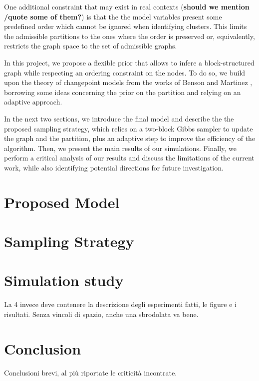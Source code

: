 One additional constraint that may exist in real contexts (\textbf{should we mention /quote some of them?}) is that the the model variables present some predefined order which cannot be ignored when identifying clusters. This limits the admissible partitions to the ones where the order is preserved or, equivalently, restricts the graph space to the set of admissible graphs. 

In this project, we propose a flexible prior that allows to infere a block-structured graph while respecting an ordering constraint on the nodes. To do so, we build upon the theory of changepoint models from the works of Benson \cite{bensonAdaptiveMCMCMultiple2018} and Martinez \cite{martinezNonparametricChangePoint2014}, borrowing some ideas concerning the prior on the partition and relying on an adaptive approach. 

In the next two sections, we introduce the final model and describe the the proposed sampling strategy, which relies on a two-block Gibbs sampler to update the graph and the partition, plus an adaptive step to improve the efficiency of the algorithm. Then, we present the main results of our simulations. Finally, we perform a critical analysis of our results and discuss the limitations of the current work, while also identifying potential directions for future investigation.  


\section{Proposed Model}


\section{Sampling Strategy}


\section{Simulation study}

La 4 invece deve contenere la descrizione degli esperimenti fatti, le figure e i risultati. Senza vincoli di spazio, anche una sbrodolata va bene.


\section{Conclusion}

Conclusioni brevi, al più riportate le criticità incontrate.